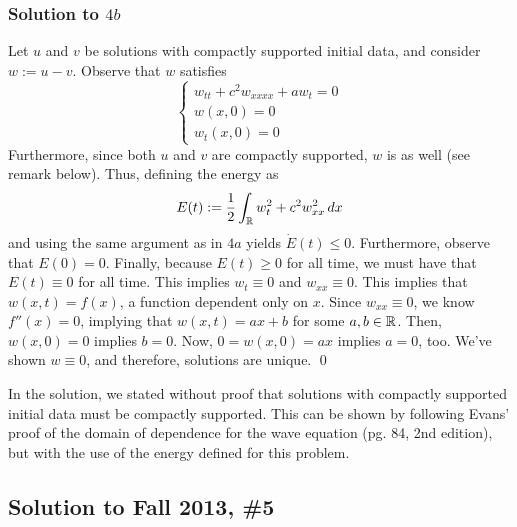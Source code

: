\subsubsection*{Solution to $4b$}

Let $u$ and $v$ be solutions with compactly supported initial data, and consider $ w:= u-v$. Observe that $w$ satisfies
$$ \left\{
\begin{array}{lll}
w_{tt} + c^2 w_{xxxx} + aw_t = 0 \\
w(x,0) = 0 \\
w_t(x,0) = 0
\end{array}
\right. $$
Furthermore, since both $u$ and $v$ are compactly supported, $w$ is as well (see remark below). Thus, defining the energy as
$$ E(t) := \frac{1}{2} \int_{\mathbb{R}} w_t^2 + c^2 w_{xx}^2 \, dx $$
and using the same argument as in $4a$ yields $\dot{E}(t) \leq 0$. Furthermore, observe that $E(0) = 0$. Finally, because $E(t) \geq 0$ for all time, we must have that $E(t) \equiv 0$ for all time. This implies $w_t \equiv 0$ and $w_{xx} \equiv 0$. This implies that $w(x,t) = f(x)$, a function dependent only on $x$. Since $w_{xx} \equiv 0$, we know $f''(x) = 0$, implying that $w(x,t) = ax+b$ for some $a, b \in \mathbb{R}$. Then, $w(x,0) = 0$ implies $b=0$. Now, $0 = w(x,0) = ax$ implies $a = 0$, too. We've shown $w \equiv 0$, and therefore, solutions are unique. \hfill \qed

\begin{rem}
In the solution, we stated without proof that solutions with compactly supported initial data must be compactly supported. This can be shown by following Evans' proof of the domain of dependence for the wave equation (pg. 84, 2nd edition), but with the use of the energy defined for this problem.
\end{rem}


\subsection*{Solution to Fall 2013, \#5}
\label{F13Q5}

